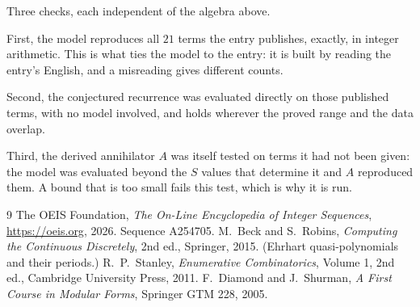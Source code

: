 \documentclass[11pt,a4paper]{article}
\theoremstyle{plain}
\theoremstyle{definition}
\begin{document}
Three checks, each independent of the algebra above.

First, the model reproduces all $21$ terms the entry publishes, exactly, in integer
arithmetic. This is what ties the model to the entry: it is built by reading the entry's
English, and a misreading gives different counts.

Second, the conjectured recurrence was evaluated directly on those published terms, with no
model involved, and holds wherever the proved range and the data overlap.

Third, the derived annihilator $A$ was itself tested on terms it had not been given: the model
was evaluated beyond the $S$ values that determine it and $A$ reproduced them. A bound that is
too small fails this test, which is why it is run.

\begin{thebibliography}{9}
 The OEIS Foundation, \emph{The On-Line Encyclopedia of Integer
Sequences}, \url{https://oeis.org}, 2026. Sequence A254705.
 M.~Beck and S.~Robins, \emph{Computing the Continuous Discretely},
2nd ed., Springer, 2015. (Ehrhart quasi-polynomials and their periods.)
 R.~P.~Stanley, \emph{Enumerative Combinatorics}, Volume 1, 2nd ed.,
Cambridge University Press, 2011.
 F.~Diamond and J.~Shurman, \emph{A First Course in Modular Forms},
Springer GTM 228, 2005.
\end{thebibliography}
\end{document}

